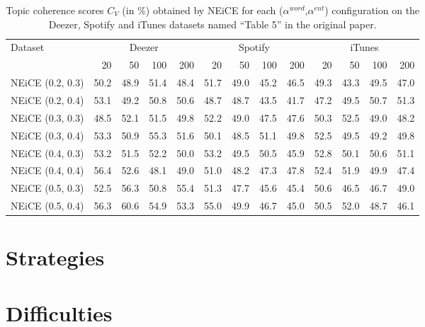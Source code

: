 \documentclass[manuscript]{acmart}
\begin{document}
\begin{table}[h]
  \centering
  \begin{tabular}{lrrrrrrrrrrrr}
      \toprule
      Dataset & \multicolumn{4}{c}{Deezer} & \multicolumn{4}{c}{Spotify} & \multicolumn{4}{c}{iTunes} \\
      & 20 & 50 & 100 & 200 & 20 & 50 & 100 & 200 & 20 & 50 & 100 & 200 \\
      \midrule
      NEiCE (0.2, 0.3) & 50.2 & 48.9 & 51.4 & 48.4 & 51.7 & 49.0 & 45.2 & 46.5 & 49.3 & 43.3 & 49.5 & 47.0 \\
      NEiCE (0.2, 0.4) & 53.1 & 49.2 & 50.8 & 50.6 & 48.7 & 48.7 & 43.5 & 41.7 & 47.2 & 49.5 & 50.7 & 51.3 \\
      NEiCE (0.3, 0.3) & 48.5 & 52.1 & 51.5 & 49.8 & 52.2 & 49.0 & 47.5 & 47.6 & 50.3 & 52.5 & 49.0 & 48.2 \\
      NEiCE (0.3, 0.4) & 53.3 & 50.9 & 55.3 & 51.6 & 50.1 & 48.5 & 51.1 & 49.8 & 52.5 & 49.5 & 49.2 & 49.8 \\
      NEiCE (0.4, 0.3) & 53.2 & 51.5 & 52.2 & 50.0 & 53.2 & 49.5 & 50.5 & 45.9 & 52.8 & 50.1 & 50.6 & 51.1 \\
      NEiCE (0.4, 0.4) & 56.4 & 52.6 & 48.1 & 49.0 & 51.0 & 48.2 & 47.3 & 47.8 & 52.4 & 51.9 & 49.9 & 47.4 \\
      NEiCE (0.5, 0.3) & 52.5 & 56.3 & 50.8 & 55.4 & 51.3 & 47.7 & 45.6 & 45.4 & 50.6 & 46.5 & 46.7 & 49.0 \\
      NEiCE (0.5, 0.4) & 56.3 & 60.6 & 54.9 & 53.3 & 55.0 & 49.9 & 46.7 & 45.0 & 50.5 & 52.0 & 48.7 & 46.1 \\
      \bottomrule
  \end{tabular}
  \caption{Topic coherence scores $C_V$ (in \%) obtained by NEiCE for each ($\alpha^{word}$,$\alpha^{ent}$) configuration on the Deezer, Spotify and iTunes datasets \textendash{} named ``Table 5'' in the original paper.}
  \label{tab:authors-results}
\end{table}


\section{Strategies}

\section{Difficulties}

\end{document}
